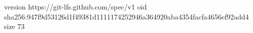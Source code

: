 version https://git-lfs.github.com/spec/v1
oid sha256:947f9d53126d1f49381d1111174252946a364920aba4354facfa4656ef92add4
size 73
